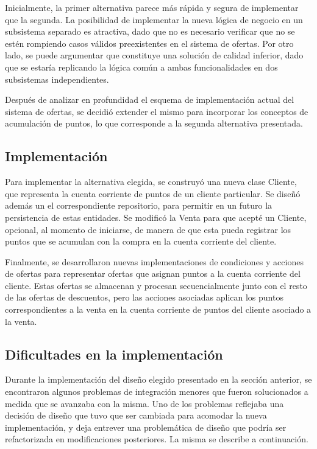\documentclass[a4paper,11pt]{article}
\begin{document}
Inicialmente, la primer alternativa parece más rápida y segura de implementar
que la segunda. La posibilidad de implementar la nueva lógica de negocio en un
subsistema separado es atractiva, dado que no es necesario verificar que no se
estén rompiendo casos válidos preexistentes en el sistema de ofertas. Por otro
lado, se puede argumentar que constituye una solución de calidad inferior, dado
que se estaría replicando la lógica común a ambas funcionalidades en dos
subsistemas independientes.

Después de analizar en profundidad el esquema de implementación actual del
sistema de ofertas, se decidió extender el mismo para incorporar los conceptos
de acumulación de puntos, lo que corresponde a la segunda alternativa
presentada.

\subsection{Implementación}

Para implementar la alternativa elegida, se construyó una nueva clase Cliente,
que representa la cuenta corriente de puntos de un cliente particular. Se
diseñó además un el correspondiente repositorio, para permitir en un futuro la
persistencia de estas entidades. Se modificó la Venta para que acepté un
Cliente, opcional, al momento de iniciarse, de manera de que esta pueda
registrar los puntos que se acumulan con la compra en la cuenta corriente del
cliente.

Finalmente, se desarrollaron nuevas implementaciones de condiciones y acciones
de ofertas para representar ofertas que asignan puntos a la cuenta corriente
del cliente. Estas ofertas se almacenan y procesan secuencialmente junto con el
resto de las ofertas de descuentos, pero las acciones asociadas aplican los
puntos correspondientes a la venta en la cuenta corriente de puntos del cliente
asociado a la venta.

\subsection{Dificultades en la implementación}

Durante la implementación del diseño elegido presentado en la sección anterior,
se encontraron algunos problemas de integración menores que fueron solucionados
a medida que se avanzaba con la misma. Uno de los problemas reflejaba una
decisión de diseño que tuvo que ser cambiada para acomodar la nueva
implementación, y deja entrever una problemática de diseño que podría ser
refactorizada en modificaciones posteriores. La misma se describe a
continuación.
\end{document}
